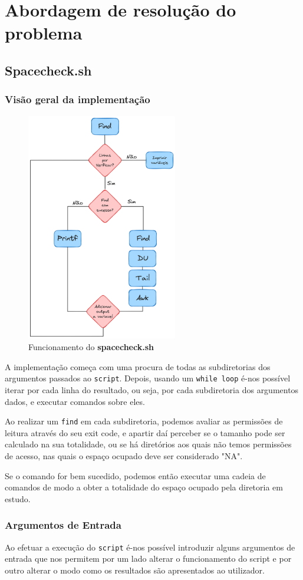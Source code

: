 \chapter{Abordagem de resolução do problema}
\section{Spacecheck.sh}
\subsection{Visão geral da implementação}
\begin{figure}[H]
    \centering
    \includegraphics[height=10cm]{Fluxograma_Implementacao.png}
    \caption{Funcionamento do \textbf{spacecheck.sh}}
\end{figure}
A implementação começa com uma procura de todas as
subdiretorias dos argumentos passados ao \verb|script|.
Depois, usando um \verb|while loop| é-nos possível iterar
por cada linha do resultado, ou seja, por cada subdiretoria
dos argumentos dados, e executar comandos sobre eles.

Ao realizar um \verb|find| em cada subdiretoria, podemos avaliar as
permissões de leitura através do seu exit code,
e apartir daí perceber se o tamanho pode ser calculado na
sua totalidade, ou se há diretórios aos quais não temos
permissões de acesso, nas quais o espaço ocupado deve ser 
considerado "NA".

Se o comando for bem sucedido, podemos então executar uma
cadeia de comandos de modo a obter a totalidade do espaço
ocupado pela diretoria em estudo.
\subsection{Argumentos de Entrada}
   Ao efetuar a execução do \verb|script| é-nos possível
   introduzir alguns argumentos de entrada que nos permitem
   por um lado alterar o funcionamento do script e por outro
   alterar o modo como os resultados são apresentados ao
   utilizador.

